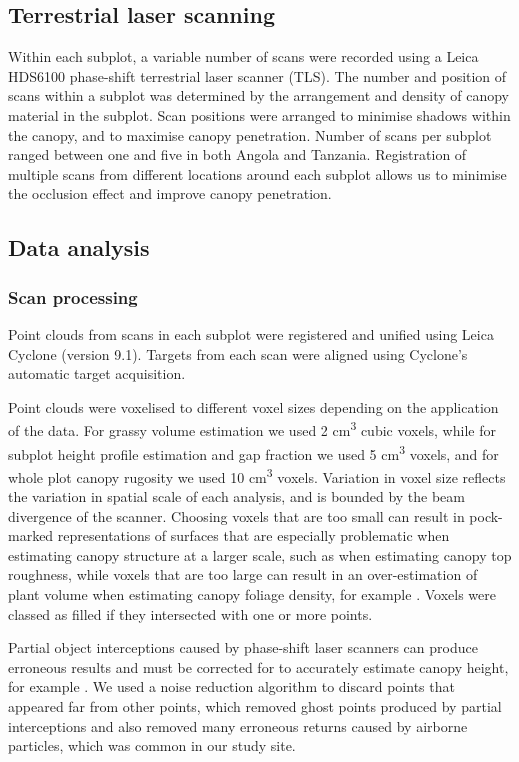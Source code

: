 \documentclass[11pt,a4paper]{article}
\begin{document}
\subsection{Terrestrial laser scanning}

Within each subplot, a variable number of scans were recorded using a Leica HDS6100 phase-shift terrestrial laser scanner (TLS). The number and position of scans within a subplot was determined by the arrangement and density of canopy material in the subplot. Scan positions were arranged to minimise shadows within the canopy, and to maximise canopy penetration. Number of scans per subplot ranged between one and five in both Angola and Tanzania. Registration of multiple scans from different locations around each subplot allows us to minimise the occlusion effect and improve canopy penetration.

\subsection{Data analysis}

\subsubsection{Scan processing}

Point clouds from scans in each subplot were registered and unified using Leica Cyclone (version 9.1). Targets from each scan were aligned using Cyclone's automatic target acquisition. 

Point clouds were voxelised to different voxel sizes depending on the application of the data. For grassy volume estimation we used 2 cm\textsuperscript{3} cubic voxels, while for subplot height profile estimation and gap fraction we used 5 cm\textsuperscript{3} voxels, and for whole plot canopy rugosity we used 10 cm\textsuperscript{3} voxels. Variation in voxel size reflects the variation in spatial scale of each analysis, and is bounded by the beam divergence of the scanner. Choosing voxels that are too small can result in pock-marked representations of surfaces that are especially problematic when estimating canopy structure at a larger scale, such as when estimating canopy top roughness, while voxels that are too large can result in an over-estimation of plant volume when estimating canopy foliage density, for example \citep{Cifuentes2014}. Voxels were classed as filled if they intersected with one or more points.

Partial object interceptions caused by phase-shift laser scanners can produce erroneous results and must be corrected for to accurately estimate canopy height, for example \citep{}. We used a noise reduction algorithm to discard points that appeared far from other points, which removed ghost points produced by partial interceptions and also removed many erroneous returns caused by airborne particles, which was common in our study site.
\end{document}

